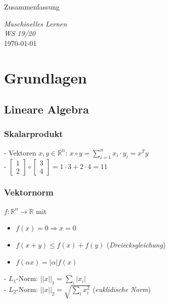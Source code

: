 \documentclass{report}
\begin{document}
\begin{center}
    \large Zusammenfassung
\end{center}

\begin{center}
    \Large \textit{Maschinelles Lernen}\\
    \vspace*{.5em}
    \normalsize \textit{WS 19/20}\\
    \vspace*{45em}
    \large \today
\end{center}

\newpage

\chapter{Grundlagen}
  \vspace*{-1.25em}
  \section{Lineare Algebra}
  \subsection{Skalarprodukt}
  - Vektoren $x, y \in \mathbb{R}^n$: $x\circ y = \sum_{i=1}^n x_i\cdot y_i = x^Ty$\\
  - $\begin{bmatrix}1\\2\end{bmatrix}\circ \begin{bmatrix}3\\4\end{bmatrix} = 1\cdot 3 + 2\cdot 4 = 11$
  \subsection{Vektornorm}
  $f: \mathbb{R}^n\rightarrow \mathbb{R}$ mit\\	
  \vspace*{-1.5em}	
  \begin{itemize}	
    \item $f(x) = 0 \Rightarrow x = 0$	
    \item $f(x + y) \leq f(x) + f(y)$ (\textit{Dreiecksgleichung})	
    \item $f(\alpha x) = |\alpha|f(x)$	
  \end{itemize}	
  - $L_1$-Norm: $||x||_1 = \sum_i|x_i|$\\	
  - $L_2$-Norm: $||x||_2 = \sqrt{\sum_i x_i^2}$ (\textit{euklidische Norm})	
\end{document}
